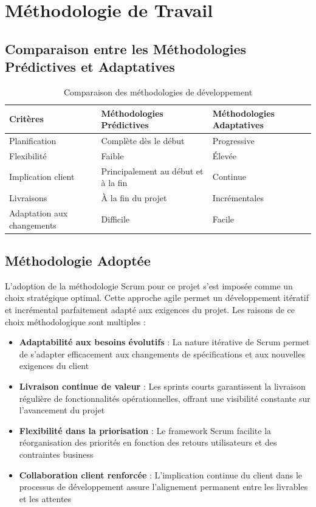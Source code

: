 \documentclass[12pt,a4paper]{report}
\begin{document}
\section{Méthodologie de Travail}
\subsection{Comparaison entre les Méthodologies Prédictives et Adaptatives}

\begin{table}[H]
\centering
\begin{tabularx}{\textwidth}{|X|X|X|}
\hline
\textbf{Critères} & \textbf{Méthodologies Prédictives} & \textbf{Méthodologies Adaptatives} \\
\hline
Planification & Complète dès le début & Progressive \\
\hline
Flexibilité & Faible & Élevée \\
\hline
Implication client & Principalement au début et à la fin & Continue \\
\hline
Livraisons & À la fin du projet & Incrémentales \\
\hline
Adaptation aux changements & Difficile & Facile \\
\hline
\end{tabularx}
\caption{Comparaison des méthodologies de développement}
\label{tab:methodologies}
\end{table}

\subsection{Méthodologie Adoptée}
L'adoption de la méthodologie Scrum pour ce projet s'est imposée comme un choix stratégique optimal. Cette approche agile permet un développement itératif et incrémental parfaitement adapté aux exigences du projet. Les raisons de ce choix méthodologique sont multiples :

\begin{itemize}
\item \textbf{Adaptabilité aux besoins évolutifs} : La nature itérative de Scrum permet de s'adapter efficacement aux changements de spécifications et aux nouvelles exigences du client
\item \textbf{Livraison continue de valeur} : Les sprints courts garantissent la livraison régulière de fonctionnalités opérationnelles, offrant une visibilité constante sur l'avancement du projet
\item \textbf{Flexibilité dans la priorisation} : Le framework Scrum facilite la réorganisation des priorités en fonction des retours utilisateurs et des contraintes business
\item \textbf{Collaboration client renforcée} : L'implication continue du client dans le processus de développement assure l'alignement permanent entre les livrables et les attentes
\end{itemize}
\end{document}
